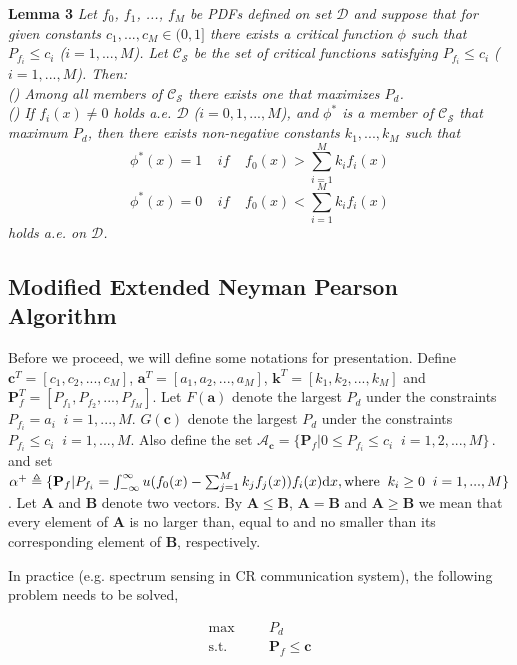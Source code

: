 \documentclass[12pt,journal,a4paper,twoside,onecolumn]{IEEEtran}
\newcommand{\rmnum}[1]{\romannumeral #1}
\begin{document}
\begin{spacing}{2.5}
\noindent \textbf{Lemma 3}
\noindent \textit{
    Let $f_0$, $f_1$, ..., $f_M$ be PDFs defined on set $\mathcal{D}$ and suppose that for given constants $c_1, ..., c_M \in (0, 1]$ there exists a critical function $\phi$ such that ${P}_{f_i} \leq c_i$ ($i=1, ..., M$). Let $\mathcal{C}_\mathcal{S}$ be the set of critical functions satisfying ${P}_{f_i} \leq c_i$ ($i=1, ..., M$).
Then:
\\\textnormal{(\rmnum{1})} Among all members of $\mathcal{C}_\mathcal{S}$ there exists one that maximizes $P_d$.
\\\textnormal{(\rmnum{2})} If $f_i(x) \neq 0$ holds a.e. $\mathcal{D}$ ($i=0, 1,..., M$), and $\phi^{\ast}$ is a member of $\mathcal{C}_\mathcal{S}$ that maximum $P_d$, then there exists non-negative constants $k_1, ..., k_M$ such that 
\[
\phi^\ast(x)= 1\;\;\;\;\textit{if}\;\;\;\;f_0(x) > \sum_{i=1}^{M}k_if_i(x)
\]
\[
\phi^\ast(x)= 0\;\;\;\;\textit{if}\;\;\;\;f_0(x) < \sum_{i=1}^{M}k_if_i(x)
\]
holds a.e. on $\mathcal{D}$.
}

\subsection{Modified Extended Neyman Pearson Algorithm}
\def \JUDGEMENT{u(f_0(x) - \sum_{j=1}^{M}k_j f_j(x))}
Before we proceed, we will define some notations for presentation.
Define $\mathbf{c}^T = [c_1, c_2, ..., c_M]$, $\mathbf{a}^T=[a_1, a_2, ..., a_M]$, $\mathbf{k}^T = [k_1, k_2, ..., k_M]$ and  $\mathbf{P}_f^T = [P_{f_1}, P_{f_2}, ..., P_{f_M}]$. Let
$F(\mathbf{a})$ denote the largest $P_d$ under the constraints $P_{f_i} = a_i\;\;i = 1, ..., M$.
$G(\mathbf{c})$ denote the largest $P_d$ under the constraints $P_{f_i} \leq c_i\;\;i = 1, ..., M$.
Also define the set $\mathcal{A}_\mathbf{c} = \{
  \mathbf{P}_f | 0 \leq P_{f_i} \leq c_i
  \;\;i=1, 2, ..., M\}\,.
$ and set $\alpha^+ \triangleq \{\mathbf{P}_f | P_{f_i} = \int_{-\infty}^{\infty} \JUDGEMENT f_i(x) \mathrm{d}x, \text{where\;\;} k_i \geq 0 \;\;i=1, ..., M\}$.
Let $\mathbf{A}$ and $\mathbf{B}$ denote two vectors. 
By $\mathbf{A} \leq \mathbf{B}$, $\mathbf{A} = \mathbf{B}$ and  $\mathbf{A} \geq \mathbf{B}$ we mean that every element of $\mathbf{A}$ is no larger than, equal to and no smaller than its corresponding element of $\mathbf{B}$, respectively. 

In practice (e.g. spectrum sensing in CR communication system), the following problem needs to be solved,

      \begin{equation}
      \label{equ: problemstate}
      \begin{split}
      \max\;\;\;\;\;\;&P_d\\
      \text{s.t.}\;\;\;\;\;\;&\mathbf{P}_f \leq \mathbf{c}
      \end{split}
      \end{equation}


\end{spacing}
\end{document}
